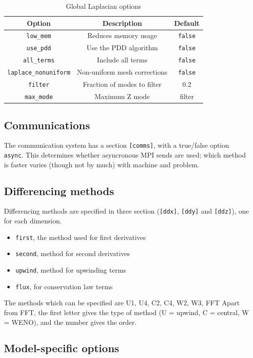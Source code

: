 \documentclass[12pt]{article}
\newcommand{\code}[1]{\texttt{#1}}
\begin{document}
\begin{table}[htbp!]
\caption{Global Laplacian options}
\label{tab:lapopts}
\centering
\begin{tabular}[c]{c c c}
\hline
Option & Description & Default \\
\hline
\texttt{low\_mem} & Reduces memory usage & \texttt{false} \\
\texttt{use\_pdd} & Use the PDD algorithm & \texttt{false} \\
\texttt{all\_terms} & Include all terms & \texttt{false} \\
\texttt{laplace\_nonuniform} & Non-uniform mesh corrections & \texttt{false} \\
\texttt{filter} & Fraction of modes to filter & 0.2 \\
\texttt{max\_mode} & Maximum Z mode & filter \\ 
\hline
\end{tabular}
\end{table}

\subsection{Communications}
The communication system has a section \code{[comms]}, with a true/false option \code{async}. This
determines whether asyncronous MPI sends are used; which method is faster varies (though not by much)
with machine and problem.

\subsection{Differencing methods}
Differencing methods are specified in three section (\code{[ddx]}, \code{[ddy]} and \code{[ddz]}), one
for each dimension. 
\begin{itemize}
\item \code{first}, the method used for first derivatives
\item \code{second}, method for second derivatives
\item \code{upwind}, method for upwinding terms
\item \code{flux}, for conservation law terms
\end{itemize}
The methods which can be specified are U1, U4, C2, C4, W2, W3, FFT
Apart from FFT, the first letter gives the type of method (U = upwind, C = central, W = WENO), and
the number gives the order.

\subsection{Model-specific options}
\end{document}
